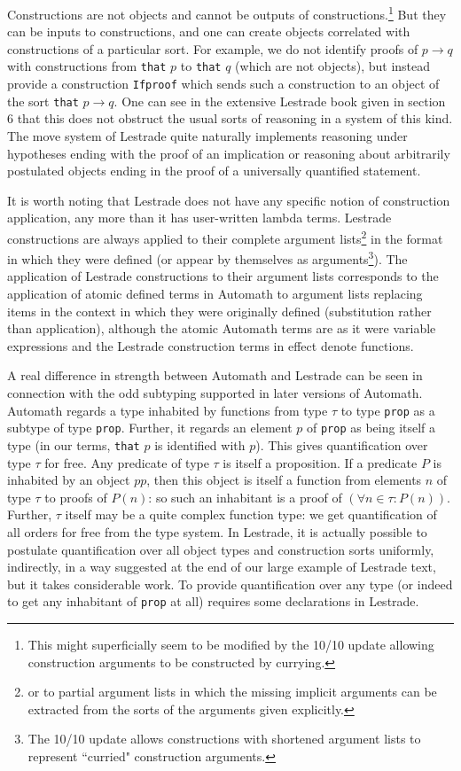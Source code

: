 \documentclass[12pt]{article}
\begin{document}
Constructions are  not objects and cannot be outputs of constructions.\footnote{This might superficially seem to be modified by the 10/10 update allowing construction arguments to be constructed by currying.}   But they can be inputs to constructions, and one can create objects correlated with constructions of a particular sort.  For example, we do not identify proofs of $p \rightarrow q$ with constructions from {\tt that} $p$ to {\tt that} $q$ (which are not objects), but instead provide a construction {\tt Ifproof} which sends such a construction to an object of the sort {\tt that} $p \rightarrow q$.  One can see in the extensive Lestrade book given in section 6 that this does not obstruct the usual sorts of reasoning in a system of this kind.  The move system of Lestrade quite naturally implements reasoning under hypotheses ending with the proof of an implication or reasoning about arbitrarily postulated objects ending in the proof of a universally quantified statement.

It is worth noting that Lestrade does not have any specific notion of construction application, any more than it has user-written lambda terms.  Lestrade constructions are always applied to their complete argument lists\footnote{or to partial argument lists in which the missing implicit arguments can be extracted from the sorts of the arguments given explicitly.} in the format in which they were defined (or appear by themselves as arguments\footnote{The 10/10 update allows constructions with shortened argument lists to represent ``curried" construction arguments.}).  The application of Lestrade constructions to their argument lists corresponds
to the application of atomic defined terms in Automath to argument lists replacing items in the context in which they were originally defined (substitution rather than application), although the atomic Automath terms are as it were variable expressions and the Lestrade construction terms in effect denote functions.

A real difference in strength between Automath and Lestrade can be seen in connection with the odd subtyping supported in later versions of Automath.  Automath regards
a type inhabited by functions from type $\tau$ to type {\tt prop} as a subtype of type {\tt prop}.  Further, it regards an element $p$ of {\tt prop} as being itself a type
(in our terms, {\tt that} $p$ is identified with $p$).   This gives quantification over type $\tau$ for free.  Any predicate of type $\tau$ is itself a proposition.  If a predicate $P$
is inhabited by an object $pp$, then this object is itself a function from elements $n$ of type $\tau$ to proofs of $P(n)$:  so such an inhabitant is a proof of $(\forall n \in \tau:P(n))$.
Further, $\tau$ itself may be a quite complex function type:  we get quantification of all orders for free from the type system.  In Lestrade, it is actually possible to postulate quantification over all object types and construction sorts uniformly, indirectly, in a way suggested at the end of our large example of Lestrade text, but it takes considerable work.  To  provide quantification over any type (or indeed to get any inhabitant of {\tt prop} at all) requires some declarations in Lestrade.
\end{document}
